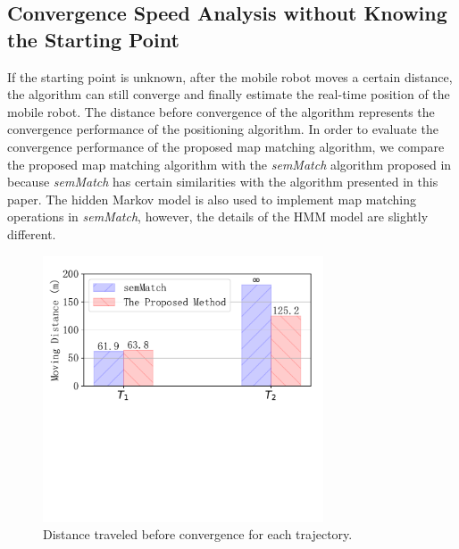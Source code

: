 \documentclass{llncs}
\begin{document}
\subsection{Convergence Speed Analysis without Knowing the Starting Point}

If the starting point is unknown, after the mobile robot moves a certain distance, the algorithm can still converge and finally estimate the real-time position of the mobile robot. The distance before convergence of the algorithm represents the convergence performance of the positioning algorithm. In order to evaluate the convergence performance of the proposed map matching algorithm, we compare the proposed map matching algorithm with the \emph{semMatch} algorithm proposed in \cite{aly2015semmatch} because \emph{semMatch} has certain similarities with the algorithm presented in this paper. The hidden Markov model is also used to implement map matching operations in \emph{semMatch}, however, the details of the HMM model are slightly different.

\begin{figure}[!htbp]
	\centering
	\includegraphics[width=3.276in]{RobotMatch-Convergence}
	\caption{Distance traveled before convergence for each trajectory.}
	\label{fig-convergence}
\end{figure}
\end{document}
